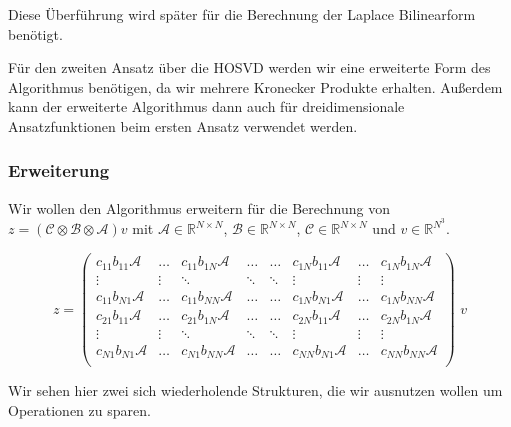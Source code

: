 Diese Überführung wird später für die Berechnung der Laplace Bilinearform benötigt.

Für den zweiten Ansatz über die HOSVD werden wir eine erweiterte Form des Algorithmus benötigen, da wir mehrere Kronecker Produkte erhalten. Außerdem kann der erweiterte Algorithmus dann auch für dreidimensionale Ansatzfunktionen beim ersten Ansatz verwendet werden.


\subsubsection{Erweiterung}
Wir wollen den Algorithmus erweitern für die Berechnung von $z=(\mathcal{C} \otimes \mathcal{B} \otimes \mathcal{A})v$ mit $\mathcal{A} \in \mathbb{R}^{N \times N}$, $\mathcal{B} \in \mathbb{R}^{N \times N}$, $\mathcal{C} \in \mathbb{R}^{N \times N}$ und $v \in \mathbb{R}^{N^3}$.


\begin{equation} z=
\begin{pmatrix}
c_{11} b_{11} \mathcal{A} & \dots  & c_{11} b_{1N} \mathcal{A} & \dots & \dots & c_{1N}b_{11}\mathcal{A} & \dots & c_{1N}b_{1N}\mathcal{A}  \\

\vdots & \vdots & \ddots & \ddots  & \ddots & \vdots & \vdots & \vdots \\
c_{11} b_{N 1} \mathcal{A} & \dots  & c_{11} b_{N N} \mathcal{A} & \dots & \dots & c_{1 N}b_{N 1}\mathcal{A} & \dots & c_{1 N}b_{N N}\mathcal{A}  \\
c_{21} b_{11} \mathcal{A} & \dots  & c_{21} b_{1N} \mathcal{A} & \dots & \dots & c_{2N}b_{11}\mathcal{A} & \dots & c_{2 N}b_{1 N}\mathcal{A}  \\
\vdots & \vdots & \ddots & \ddots  & \ddots & \vdots & \vdots & \vdots \\
c_{N 1} b_{N 1} \mathcal{A} & \dots  & c_{N 1} b_{N N} \mathcal{A} & \dots & \dots & c_{N N}b_{N 1}\mathcal{A} & \dots & c_{N N}b_{N N}\mathcal{A}  \\
\end{pmatrix} \, \, v
\end{equation}

Wir sehen hier zwei sich wiederholende Strukturen, die wir ausnutzen wollen um Operationen zu sparen.

